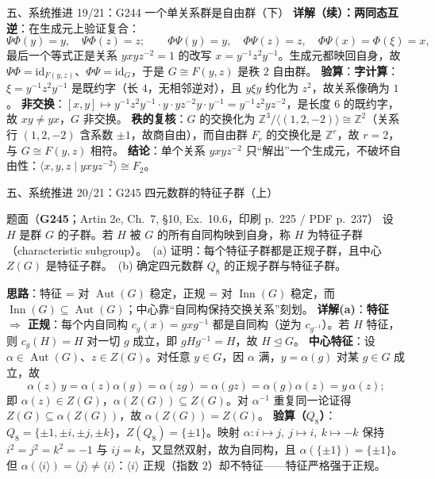 \documentclass[aspectratio=169,10pt,fontset=none]{ctexbeamer}
\newcommand{\ex}[1]{\textcolor{accent}{\footnotesize\bfseries #1}}
\newcommand{\key}[1]{\textcolor{ink}{\bfseries #1}}
\begin{document}
\begin{frame}[t]{五、系统推进 19/21：G244 一个单关系群是自由群（下）}
\scriptsize
\key{详解（续）：两同态互逆}：在生成元上验证复合：
\[ \Psi\Phi(y)=y,\quad\Psi\Phi(z)=z;\qquad \Phi\Psi(y)=y,\quad\Phi\Psi(z)=z,\quad\Phi\Psi(x)=\Phi(\xi)=x, \]
最后一个等式正是关系 $yxyz^{-2}=1$ 的改写 $x=y^{-1}z^2y^{-1}$。生成元都映回自身，故 $\Psi\Phi=\mathrm{id}_{F(y,z)}$、$\Phi\Psi=\mathrm{id}_{G}$，于是 $G\cong F(y,z)$ 是秩 $2$ 自由群。
\key{验算}：\textbf{字计算}：$\xi=y^{-1}z^2y^{-1}$ 是既约字（长 $4$，无相邻逆对），且 $y\xi y$ 约化为 $z^2$，故关系像确为 $1$。
\textbf{非交换}：$[x,y]\mapsto y^{-1}z^2y^{-1}\cdot y\cdot yz^{-2}y\cdot y^{-1}=y^{-1}z^2yz^{-2}$，是长度 $6$ 的既约字，故 $xy\ne yx$，$G$ 非交换。
\textbf{秩的复核}：$G$ 的交换化为 $\mathbb Z^3/\langle(1,2,-2)\rangle\cong\mathbb Z^2$（关系行 $(1,2,-2)$ 含系数 $\pm1$，故商自由），而自由群 $F_r$ 的交换化是 $\mathbb Z^r$，故 $r=2$，与 $G\cong F(y,z)$ 相符。
\key{结论}：单个关系 $yxyz^{-2}$ 只“解出”一个生成元，不破坏自由性：$\langle x,y,z\mid yxyz^{-2}\rangle\cong F_2$。
\end{frame}

\begin{frame}[t]{五、系统推进 20/21：G245 四元数群的特征子群（上）}
\label{ex:G245}
\scriptsize
\begin{block}{\footnotesize 题面（\ex{G245}；Artin 2e, Ch.~7, \S10, Ex.~10.6，印刷 p.~225 / PDF p.~237）}
设 $H$ 是群 $G$ 的子群。若 $H$ 被 $G$ 的所有自同构映到自身，称 $H$ 为特征子群（characteristic subgroup）。\ (a) 证明：每个特征子群都是正规子群，且中心 $Z(G)$ 是特征子群。\ (b) 确定四元数群 $Q_8$ 的正规子群与特征子群。
\end{block}
\key{思路}：特征 = 对 $\operatorname{Aut}(G)$ 稳定，正规 = 对 $\operatorname{Inn}(G)$ 稳定，而 $\operatorname{Inn}(G)\subseteq\operatorname{Aut}(G)$；中心靠“自同构保持交换关系”刻划。
\key{详解(a)}：\textbf{特征 $\Rightarrow$ 正规}：每个内自同构 $c_g(x)=gxg^{-1}$ 都是自同构（逆为 $c_{g^{-1}}$）。若 $H$ 特征，则 $c_g(H)=H$ 对一切 $g$ 成立，即 $gHg^{-1}=H$，故 $H\trianglelefteq G$。
\textbf{中心特征}：设 $\alpha\in\operatorname{Aut}(G)$、$z\in Z(G)$。对任意 $y\in G$，因 $\alpha$ 满，$y=\alpha(g)$ 对某 $g\in G$ 成立，故
\[ \alpha(z)\,y=\alpha(z)\alpha(g)=\alpha(zg)=\alpha(gz)=\alpha(g)\alpha(z)=y\,\alpha(z); \]
即 $\alpha(z)\in Z(G)$，$\alpha(Z(G))\subseteq Z(G)$。对 $\alpha^{-1}$ 重复同一论证得 $Z(G)\subseteq\alpha(Z(G))$，故 $\alpha(Z(G))=Z(G)$。
\key{验算（$Q_8$）}：$Q_8=\{\pm1,\pm i,\pm j,\pm k\}$，$Z(Q_8)=\{\pm1\}$。映射 $\alpha:i\mapsto j,\ j\mapsto i,\ k\mapsto-k$ 保持 $i^2=j^2=k^2=-1$ 与 $ij=k$，又显然双射，故为自同构，且 $\alpha(\{\pm1\})=\{\pm1\}$。但 $\alpha(\langle i\rangle)=\langle j\rangle\ne\langle i\rangle$：$\langle i\rangle$ 正规（指数 $2$）却不特征——特征严格强于正规。
\end{frame}
\end{document}
